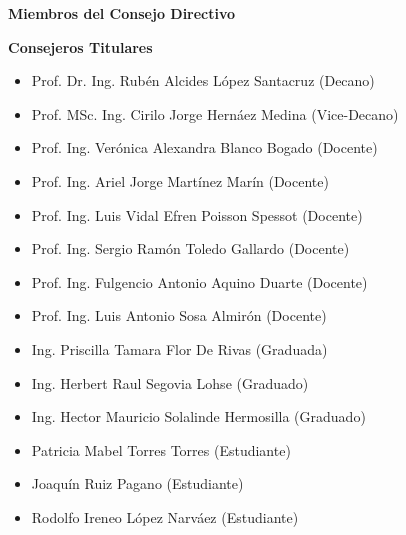 \begin{center}
\textbf{Miembros del Consejo Directivo}
\end{center}
	\vspace{-5mm}


    


\begin{center}
\textbf{Consejeros Titulares}
\end{center}
	\vspace{-5mm}

\begin{itemize}
	\item Prof. Dr. Ing. Rubén Alcides López Santacruz (Decano)
	\item Prof. MSc. Ing. Cirilo Jorge Hernáez Medina (Vice-Decano)
    \item Prof. Ing. Verónica Alexandra Blanco Bogado (Docente)
    \item Prof. Ing. Ariel Jorge Martínez Marín (Docente)
    \item Prof. Ing. Luis Vidal Efren Poisson Spessot (Docente)
    \item Prof. Ing. Sergio Ramón Toledo Gallardo (Docente)
    \item Prof. Ing. Fulgencio Antonio Aquino Duarte (Docente)
    \item Prof. Ing. Luis Antonio Sosa Almirón (Docente)
    \item Ing. Priscilla Tamara Flor De Rivas (Graduada)
    \item Ing. Herbert Raul Segovia Lohse (Graduado)
    \item Ing. Hector Mauricio Solalinde Hermosilla (Graduado)
    \item Patricia Mabel Torres Torres (Estudiante)
    \item Joaquín Ruiz Pagano (Estudiante)
    \item Rodolfo Ireneo López Narváez (Estudiante)
\end{itemize}


